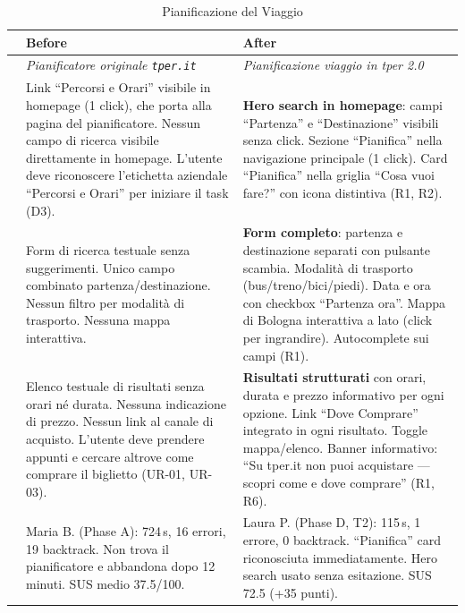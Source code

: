 \begin{table}[H]
\centering
\small
\renewcommand{\arraystretch}{1.4}
\begin{tabular}{|p{0.5cm}|p{7cm}|p{7cm}|}
\hline
& \textbf{Before} & \textbf{After} \\ \hline
\cellcolor{primaryColor!15} &
\textit{Pianificatore originale \texttt{tper.it}} &
\textit{Pianificazione viaggio in tper 2.0} \\ \hline

\raisebox{0.5cm}{\rotatebox{90}{\textbf{Accesso}}} &
Link ``Percorsi e Orari'' visibile in homepage (1 click), che porta alla pagina del pianificatore. Nessun campo di ricerca visibile direttamente in homepage. L'utente deve riconoscere l'etichetta aziendale ``Percorsi e Orari'' per iniziare il task (D3). &
\textbf{Hero search in homepage}: campi ``Partenza'' e ``Destinazione'' visibili senza click. Sezione ``Pianifica'' nella navigazione principale (1 click). Card ``Pianifica'' nella griglia ``Cosa vuoi fare?'' con icona distintiva (R1, R2). \\ \hline

\raisebox{0.5cm}{\rotatebox{90}{\textbf{Form}}} &
Form di ricerca testuale senza suggerimenti. Unico campo combinato partenza/destinazione. Nessun filtro per modalità di trasporto. Nessuna mappa interattiva. &
\textbf{Form completo}: partenza e destinazione separati con pulsante scambia. Modalità di trasporto (bus/treno/bici/piedi). Data e ora con checkbox ``Partenza ora''. Mappa di Bologna interattiva a lato (click per ingrandire). Autocomplete sui campi (R1). \\ \hline

\raisebox{0.5cm}{\rotatebox{90}{\textbf{Risultati}}} &
Elenco testuale di risultati senza orari né durata. Nessuna indicazione di prezzo. Nessun link al canale di acquisto. L'utente deve prendere appunti e cercare altrove come comprare il biglietto (UR-01, UR-03). &
\textbf{Risultati strutturati} con orari, durata e prezzo informativo per ogni opzione. Link ``Dove Comprare'' integrato in ogni risultato. Toggle mappa/elenco. Banner informativo: ``Su tper.it non puoi acquistare --- scopri come e dove comprare'' (R1, R6). \\ \hline

\raisebox{0.5cm}{\rotatebox{90}{\textbf{Impatto}}} &
Maria B. (Phase A): 724\,s, 16 errori, 19 backtrack. Non trova il pianificatore e abbandona dopo 12 minuti. SUS medio 37.5/100. &
Laura P. (Phase D, T2): 115\,s, 1 errore, 0 backtrack. ``Pianifica'' card riconosciuta immediatamente. Hero search usato senza esitazione. SUS 72.5 (+35 punti). \\ \hline
\end{tabular}
\caption{Pianificazione del Viaggio}
\label{tab:comparison-planning}
\end{table}

